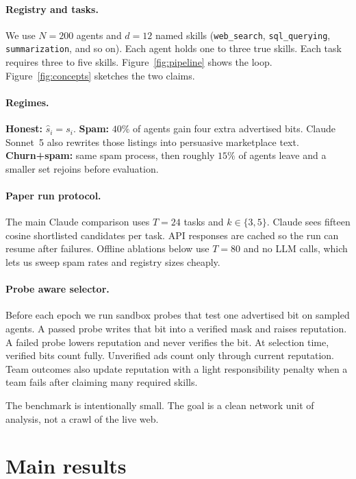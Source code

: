 \documentclass{article}
\begin{document}
\paragraph{Registry and tasks.}
We use $N{=}200$ agents and $d{=}12$ named skills (\texttt{web\_search}, \texttt{sql\_querying}, \texttt{summarization}, and so on).
Each agent holds one to three true skills.
Each task requires three to five skills.
Figure~\ref{fig:pipeline} shows the loop.
Figure~\ref{fig:concepts} sketches the two claims.

\paragraph{Regimes.}
\textbf{Honest:} $\hat s_i=s_i$.
\textbf{Spam:} $40\%$ of agents gain four extra advertised bits.
Claude Sonnet~5 also rewrites those listings into persuasive marketplace text.
\textbf{Churn+spam:} same spam process, then roughly $15\%$ of agents leave and a smaller set rejoins before evaluation.

\paragraph{Paper run protocol.}
The main Claude comparison uses $T{=}24$ tasks and $k\in\{3,5\}$.
Claude sees fifteen cosine shortlisted candidates per task.
API responses are cached so the run can resume after failures.
Offline ablations below use $T{=}80$ and no LLM calls, which lets us sweep spam rates and registry sizes cheaply.

\paragraph{Probe aware selector.}
Before each epoch we run sandbox probes that test one advertised bit on sampled agents.
A passed probe writes that bit into a verified mask and raises reputation.
A failed probe lowers reputation and never verifies the bit.
At selection time, verified bits count fully.
Unverified ads count only through current reputation.
Team outcomes also update reputation with a light responsibility penalty when a team fails after claiming many required skills.

The benchmark is intentionally small.
The goal is a clean network unit of analysis, not a crawl of the live web.

\section{Main results}
\end{document}

